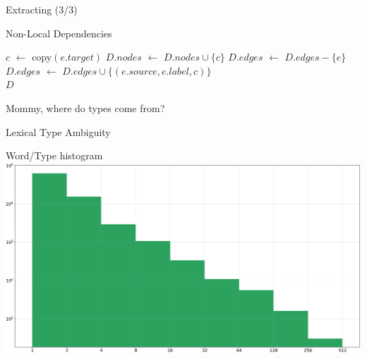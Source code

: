 \documentclass{beamer}
\begin{document}
\begin{frame}{Extracting (3/3)}

	\begin{block}{Non-Local Dependencies}
	\begin{algorithmic}
			\State $c$ $\gets$ copy$(e.target)$
			\State $D.nodes$ $\gets$ $D.nodes \cup \{c\}$
			\State $D.edges$ $\gets$ $D.edges - \{e\}$
			\State $D.edges$ $\gets$ $D.edges \cup \{(e.source, e.label, c)\}$
		\EndFor\\
		\Return $D$
	\EndFunction
	\end{algorithmic}
	\end{block}	
\end{frame}

\begin{frame}{}
	\centering
		\alert{Mommy, where do types come from?}

\end{frame}

\begin{frame}{Lexical Type Ambiguity}

	\begin{block}{Word/Type histogram}
	\includegraphics[keepaspectratio,width=\textwidth]{oracle.png}
	\end{block}
\end{frame}
\end{document}
